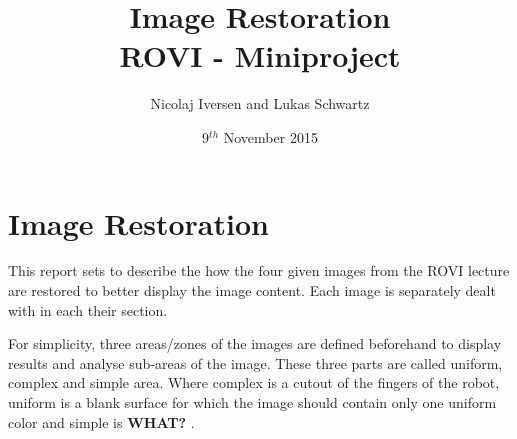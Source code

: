 \documentclass[12pt,a4paper,conference]{IEEEtran}
\begin{document}
\raggedbottom

\title{Image Restoration\\ \large{ROVI - Miniproject}}
\author{Nicolaj Iversen and Lukas Schwartz}
\date{9$^{th}$ November 2015}

\maketitle

\section{Image Restoration}
This report sets to describe the how the four given images from the ROVI lecture are restored to better display the image content.
Each image is separately dealt with in each their section.

For simplicity, three areas/zones of the images are defined beforehand to display results and analyse sub-areas of the image.
These three parts are called uniform, complex and simple area.
Where complex is a cutout of the fingers of the robot, uniform is a blank surface for which the image should contain only one uniform color and simple is \textbf{WHAT?} .











\end{document}
